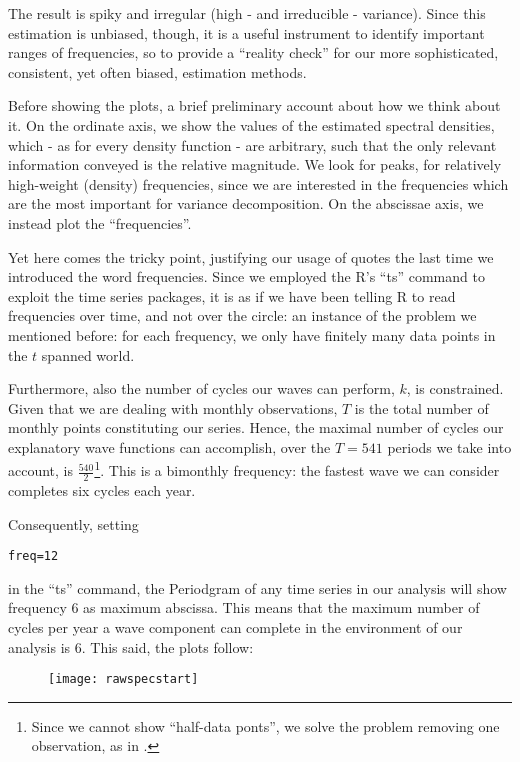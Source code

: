 \documentclass[12pt]{article} %
\begin{document}
The result is spiky and irregular (high - and irreducible - variance). Since this estimation is unbiased, though, it is a useful instrument to identify important ranges of frequencies, so to provide a ``reality check'' for our more sophisticated, consistent, yet often biased, estimation methods. 

Before showing the plots, a brief preliminary account about how we think about it. On the ordinate axis, we show the values of the estimated spectral densities, which - as for every density function - are arbitrary, such that the only relevant information conveyed is the relative magnitude. We look for peaks, for relatively high-weight (density) frequencies, since we are interested in the frequencies which are the most important for variance decomposition. On the abscissae axis, we instead plot the ``frequencies''. 

Yet here comes the tricky point, justifying our usage of quotes the last time we introduced the word frequencies. Since we employed the R's ``ts'' command to exploit the time series packages, it is as if we have been telling R to read frequencies over time, and not over the circle: an instance of the problem we mentioned before: for each frequency, we only have finitely many data points in the ${t}$ spanned world. 

Furthermore, also the number of cycles our waves can perform, $k$,  is constrained. Given that we are dealing with monthly observations, $T$ is the total number of monthly points constituting our series. Hence, the maximal number of cycles our explanatory wave functions can accomplish, over the $T=541$ periods we take into account, is $\frac{540}{2}$\footnote{Since we cannot show ``half-data ponts'', we solve the problem removing one observation, as in \citet{hammy}.}. This is a bimonthly frequency: the fastest wave we can consider completes six cycles each year. 

Consequently, setting 
\begin{verbatim}
freq=12
\end{verbatim} 
in the ``ts'' command, the Periodgram of any time series in our analysis will show frequency 6 as maximum abscissa. This means that the maximum number of cycles per year a wave component can complete in the environment of our analysis is 6.
This said, the plots follow:

\begin{figure}[h!]
\begin{center}
\texttt{[image: rawspecstart]}
\caption{}
\end{center}
\end{figure}
\end{document}
